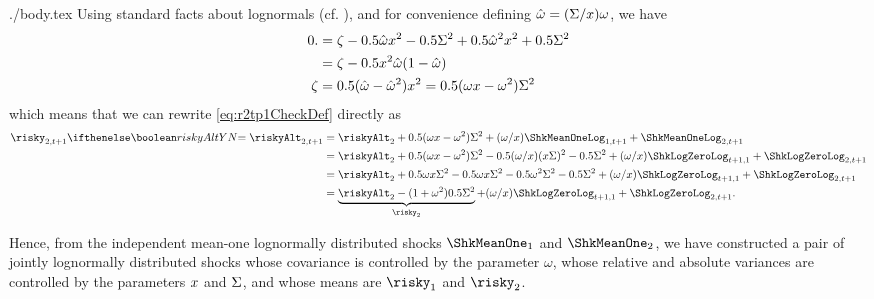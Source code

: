\documentclass{handout}
\begin{document}
\begin{verbatimwrite}{./body.tex}
Using standard facts about lognormals (cf. \MathFactsList), and for convenience 
defining $\hat{\omega}= (\Sigma/x) \omega$, we have 
\begin{equation}\begin{gathered}\begin{aligned}
  0. & =  \zeta - 0.5 \hat{\omega} x^{2} - 0.5 \Sigma^{2} + 0.5\hat{\omega}^{2}x^{2}+0.5  \Sigma^{2}
\\ & =  \zeta -0.5 x^{2} \hat{\omega}(1-\hat{\omega})
\\ \zeta & =  0.5 (\hat{\omega}-\hat{\omega}^{2}) x^{2} = 0.5 (\omega x-\omega^{2}) \Sigma^{2}
\end{aligned}\end{gathered}\end{equation}
which means that we can rewrite \eqref{eq:r2tp1CheckDef} directly as
\begin{equation*}\begin{gathered}\begin{aligned}
   \risky_{2,t+1} \ifriskyAlt{= \riskyAlt_{2,t+1}}{} & =  \riskyAlt_{2}+0.5 (\omega \scale-\omega^{2}) \sigAll^{2} + (\omega /\scale) \ShkMeanOneLog_{1,t+1} + \ShkMeanOneLog_{2,t+1} 
\\ & =  \riskyAlt_{2}+0.5 (\omega \scale-\omega^{2}) \sigAll^{2} -0.5 (\omega/\scale)(\scale \sigAll)^2-0.5 \sigAll^{2}+(\omega /\scale) \ShkLogZeroLog_{t+1,1}  + \ShkLogZeroLog_{2,t+1} 
\\ & =  \riskyAlt_{2}+0.5 \omega \scale \sigAll^{2} -0.5 \omega\scale \sigAll^2 - 0.5 \omega^{2} \sigAll^{2}-0.5 \sigAll^{2}+(\omega /\scale) \ShkLogZeroLog_{t+1,1}  + \ShkLogZeroLog_{2,t+1} 
\\ & =  \underbrace{\riskyAlt_{2} - (1+\omega^{2})0.5 \sigAll^{2}}_{\risky_{2}}+(\omega /\scale) \ShkLogZeroLog_{t+1,1}  + \ShkLogZeroLog_{2,t+1} 
.
\end{aligned}\end{gathered}\end{equation*}


Hence, from the independent mean-one lognormally distributed shocks
$\ShkMeanOne_{1}$ and $\ShkMeanOne_{2}$, we have constructed a pair of
jointly lognormally distributed shocks whose covariance is controlled
by the parameter $\omega$, whose relative and absolute variances are
controlled by the parameters $x$ and $\Sigma$, and whose means
are $\risky_{1}$ and $\risky_{2}$.


\end{verbatimwrite}
\end{document}
